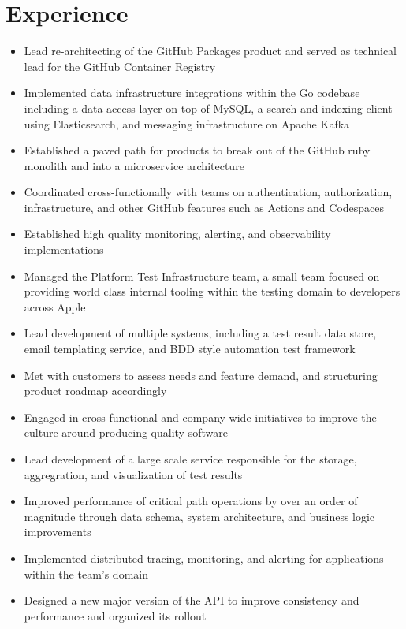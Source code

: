 \documentclass[11pt,letterpaper,sans]{moderncv}        %
\begin{document}
\makecvtitle

\vspace{-10mm}

\section{Experience}

\begin{itemize}
\item Lead re-architecting of the GitHub Packages product and served as technical lead for the GitHub Container Registry
\item Implemented data infrastructure integrations within the Go codebase including a data access layer on top of MySQL, a search and indexing client using Elasticsearch, and messaging infrastructure on Apache Kafka
\item Established a paved path for products to break out of the GitHub ruby monolith and into a microservice architecture
\item Coordinated cross-functionally with teams on authentication, authorization, infrastructure, and other GitHub features such as Actions and Codespaces
\item Established high quality monitoring, alerting, and observability implementations
\end{itemize}

\begin{itemize}
\item Managed the Platform Test Infrastructure team, a small team focused on providing world class internal tooling within the testing domain to developers across Apple
\item Lead development of multiple systems, including a test result data store, email templating service, and BDD style automation test framework
\item Met with customers to assess needs and feature demand, and structuring product roadmap accordingly
\item Engaged in cross functional and company wide initiatives to improve the culture around producing quality software
\end{itemize}

\begin{itemize}
\item Lead development of a large scale service responsible for the storage, aggregration, and visualization of test results
\item Improved performance of critical path operations by over an order of magnitude through data schema, system architecture, and business logic improvements
\item Implemented distributed tracing, monitoring, and alerting for applications within the team's domain
\item Designed a new major version of the API to improve consistency and performance and organized its rollout
\end{itemize}
\end{document}
